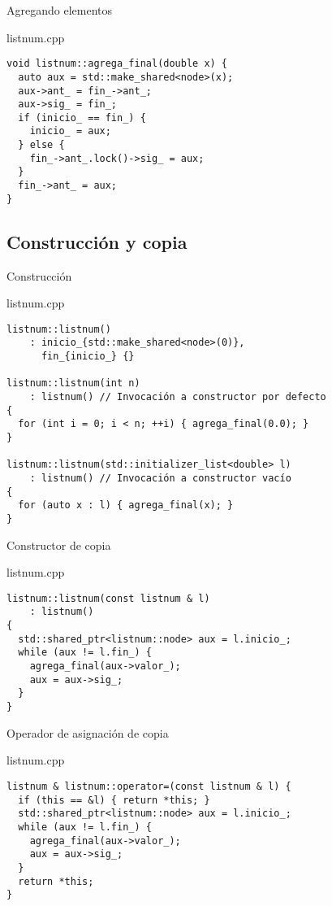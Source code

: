 \begin{frame}[t,fragile]{Agregando elementos}
\begin{block}{listnum.cpp}
\begin{lstlisting}
void listnum::agrega_final(double x) {
  auto aux = std::make_shared<node>(x);
  aux->ant_ = fin_->ant_;
  aux->sig_ = fin_;
  if (inicio_ == fin_) {
    inicio_ = aux;
  } else {
    fin_->ant_.lock()->sig_ = aux;
  }
  fin_->ant_ = aux;
}
\end{lstlisting}
\end{block}
\end{frame}

\subsection{Construcción y copia}

\begin{frame}[t,fragile]{Construcción}
\begin{block}{listnum.cpp}
\begin{lstlisting}
listnum::listnum() 
    : inicio_{std::make_shared<node>(0)}, 
      fin_{inicio_} {}

listnum::listnum(int n) 
    : listnum() // Invocación a constructor por defecto
{
  for (int i = 0; i < n; ++i) { agrega_final(0.0); }
}

listnum::listnum(std::initializer_list<double> l) 
    : listnum() // Invocación a constructor vacío
{
  for (auto x : l) { agrega_final(x); }
}
\end{lstlisting}
\end{block}
\end{frame}

\begin{frame}[t,fragile]{Constructor de copia}
\begin{block}{listnum.cpp}
\begin{lstlisting}
listnum::listnum(const listnum & l) 
    : listnum() 
{
  std::shared_ptr<listnum::node> aux = l.inicio_;
  while (aux != l.fin_) {
    agrega_final(aux->valor_);
    aux = aux->sig_;
  }
}
\end{lstlisting}
\end{block}
\end{frame}

\begin{frame}[t,fragile]{Operador de asignación de copia}
\begin{block}{listnum.cpp}
\begin{lstlisting}
listnum & listnum::operator=(const listnum & l) {
  if (this == &l) { return *this; }
  std::shared_ptr<listnum::node> aux = l.inicio_;
  while (aux != l.fin_) {
    agrega_final(aux->valor_);
    aux = aux->sig_;
  }
  return *this;
}
\end{lstlisting}
\end{block}
\end{frame}

